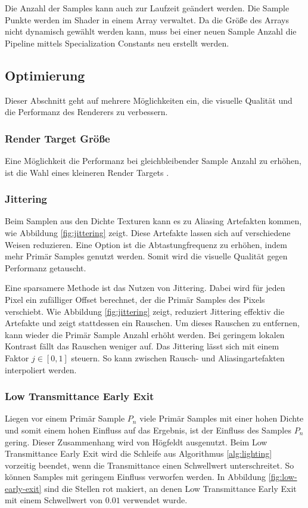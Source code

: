 Die Anzahl der Samples kann auch zur Laufzeit geändert werden. Die Sample Punkte werden im Shader in einem Array verwaltet. Da die Größe des Arrays nicht dynamisch gewählt werden kann, muss bei einer neuen Sample Anzahl die Pipeline mittels Specialization Constants neu erstellt werden.

\subsection{Optimierung}
Dieser Abschnitt geht auf mehrere Möglichkeiten ein, die visuelle Qualität und die Performanz des Renderers zu verbessern.

\subsubsection{Render Target Größe}
Eine Möglichkeit die Performanz bei gleichbleibender Sample Anzahl zu erhöhen, ist die Wahl eines kleineren Render Targets \cite{Högfeldt16}.

\subsubsection{Jittering}
Beim Samplen aus den Dichte Texturen kann es zu Aliasing Artefakten kommen, wie Abbildung \ref{fig:jittering} zeigt. Diese Artefakte lassen sich auf verschiedene Weisen reduzieren. Eine Option ist die Abtastungfrequenz zu erhöhen, indem mehr Primär Samples genutzt werden. Somit wird die visuelle Qualität gegen Performanz getauscht.

Eine sparsamere Methode ist das Nutzen von Jittering. Dabei wird für jeden Pixel ein zufälliger Offset berechnet, der die Primär Samples des Pixels verschiebt. Wie Abbildung \ref{fig:jittering} zeigt, reduziert Jittering effektiv die Artefakte und zeigt stattdessen ein Rauschen. Um dieses Rauschen zu entfernen, kann wieder die Primär Sample Anzahl erhöht werden. Bei geringem lokalen Kontrast fällt das Rauschen weniger auf. Das Jittering lässt sich mit einem Faktor $ j \in [0, 1] $ steuern. So kann zwischen Rausch- und Aliasingartefakten interpoliert werden.

\subsubsection{Low Transmittance Early Exit}
Liegen vor einem Primär Sample $ P_n $ viele Primär Samples mit einer hohen Dichte und somit einem hohen Einfluss auf das Ergebnis, ist der Einfluss des Samples $ P_n $ gering. Dieser Zusammenhang wird von Högfeldt \cite{Högfeldt16} ausgenutzt. Beim Low Transmittance Early Exit wird die Schleife aus Algorithmus \ref{alg:lighting} vorzeitig beendet, wenn die Transmittance einen Schwellwert unterschreitet. So können Samples mit geringem Einfluss verworfen werden. In Abbildung \ref{fig:low-early-exit} sind die Stellen rot makiert, an denen Low Transmittance Early Exit mit einem Schwellwert von $ 0.01 $ verwendet wurde.

